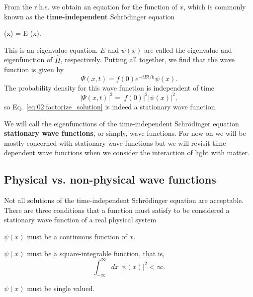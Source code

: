 \documentclass[../Main/chem331-notes.tex]{subfiles}
\begin{document}
From the r.h.s. we obtain an equation for the function of $x$, which is commonly known as the \textbf{time-independent} Schr\"{o}dinger equation
\begin{iequation}
\psi(x) = E \psi(x).
\end{iequation}
This is an eigenvalue equation. $E$ and $\psi(x)$ are called the eigenvalue and eigenfunction of $\hat{H}$, respectively.
Putting all together, we find that the wave function is given by
\begin{equation}
\label{eq:02:factorize_solution}
\Psi(x,t) = f(0) e^{-i E t / \hbar} \psi(x).
\end{equation}
The probability density for this wave function is independent of time
\begin{equation}
|\Psi(x,t)|^2 =  |f(0)|^2 |\psi(x)|^2,
\end{equation}
so Eq.~\eqref{eq:02:factorize_solution} is indeed a stationary wave function.

We will call the eigenfunctions of the time-independent Schr\"{o}dinger equation \textbf{stationary wave functions}, or simply, wave functions.
For now on we will be mostly concerned with stationary wave functions but we will revisit time-dependent wave functions when we consider the interaction of light with matter.

\subsection{Physical vs. non-physical wave functions}
Not all solutions of the time-independent Schr\"{o}dinger equation are acceptable.
There are three conditions that a function must satisfy to be considered a stationary wave function of a real physical system
\begin{ibox}
\begin{myitems}
\item $\psi(x)$ must be a continuous function of $x$.
\item $\psi(x)$ must be a square-integrable function, that is,
\begin{equation}
\int_{-\infty}^{\infty} dx \, |\psi(x)|^2 < \infty.
\end{equation}
\item $\psi(x)$ must be single valued.
\end{myitems}
\end{ibox}
\end{document}
